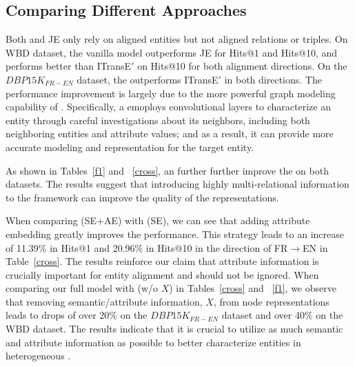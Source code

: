 \subsection{Comparing Different Approaches\label{sec:analysis}}




 Both  \GCN and JE only rely on aligned entities but not aligned relations or triples.  On WBD dataset,
the vanilla \GCN model outperforms JE for Hits@1 and Hits@10, and performs better than ITransE$'$ on Hits@10 for both alignment directions.
On the $DBP15K_{FR-EN}$ dataset, the \GCN outperforms ITransE$'$ in both directions. The performance improvement is largely due to the more
powerful graph modeling capability of \GCNs. Specifically, a \GCN emoploys convolutional layers to characterize an entity through careful
investigations about its neighbors, including both neighboring entities and attribute values; and as a result, it can provide more accurate
modeling and representation for the target entity.

 As shown in Tables~\ref{f1} and ~\ref{cross}, an \RGCN further further improve the \GCN on both datasets. The
results suggest that introducing highly multi-relational information to the \GCN framework can improve the quality of the \KG
representations.


 When comparing \HRGCN (SE+AE) with  \HRGCN (SE), we can see that adding attribute embedding greatly improves
the performance. This strategy leads to an increase of 11.39\%  in Hits@1 and 20.96\% in Hits@10 in the direction of FR$\rightarrow$EN in
Table~\ref{cross}. The results reinforce our claim that attribute information is crucially important for entity alignment and should not be
ignored. When comparing our full model \HRGCN with \HRGCN (w/o $X$) in Tables~\ref{cross} and ~\ref{f1}, we observe that removing
semantic/attribute information, $X$, from node representations leads to drops of over 20\% on the $DBP15K_{FR-EN}$ dataset and over 40\% on
the WBD dataset. The results indicate that it is crucial to utilize as much semantic and attribute information as possible to better
characterize entities in heterogeneous \KGs.

